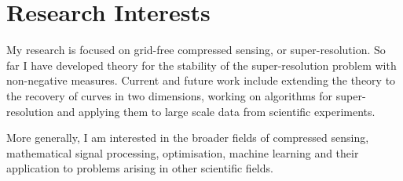 \documentclass[11pt,a4paper,roman]{moderncv} %
\begin{document}


%
%
%
%
%


\makecvtitle %




\section{Research Interests}
My research is focused on grid-free compressed sensing, or super-resolution. 
So far I have developed theory for the stability of the super-resolution problem 
with non-negative measures. 
Current and future work include extending the theory to the recovery 
of curves in two dimensions, working on algorithms for super-resolution and
applying them to large scale data from scientific experiments.
\newline

More generally, I am interested in the broader fields of compressed sensing, 
mathematical signal processing, optimisation, machine learning 
and their application to problems arising in other scientific fields.



\end{document}
